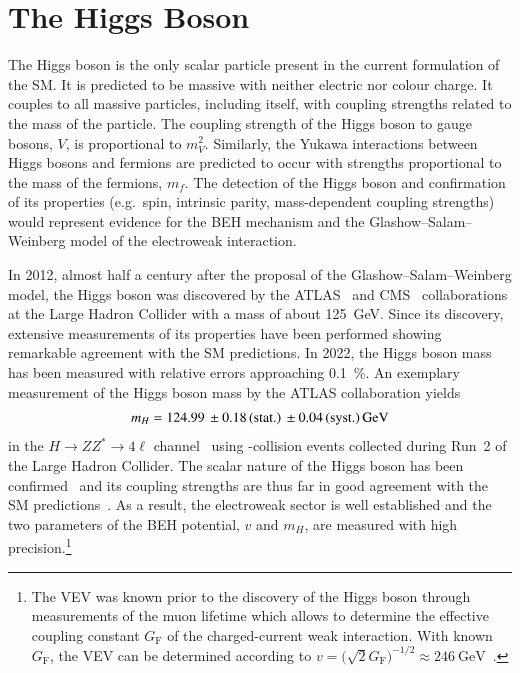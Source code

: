 \section{The Higgs Boson}

The Higgs boson is the only scalar particle present in the current formulation
of the SM. It is predicted to be massive with neither electric nor colour
charge. It couples to all massive particles, including itself, with coupling
strengths related to the mass of the particle. The coupling strength of the
Higgs boson to gauge bosons, $V$, is proportional to $m_{V}^2$. Similarly, the
Yukawa interactions between Higgs bosons and fermions are predicted to occur
with strengths proportional to the mass of the fermions, $m_f$. The detection of
the Higgs boson and confirmation of its properties (e.g.\ spin, intrinsic
parity, mass-dependent coupling strengths) would represent evidence
for the BEH mechanism and the Glashow--Salam--Weinberg model of the electroweak
interaction.

In 2012, almost half a century after the proposal of the
Glashow--Salam--Weinberg model, the Higgs boson was discovered by the
ATLAS~\cite{HIGG-2012-27} and CMS~\cite{CMS-HIG-12-028} collaborations at the
Large Hadron Collider with a mass of about \SI{125}{\GeV}. Since its discovery,
extensive measurements of its properties have been performed showing remarkable
agreement with the SM predictions. In 2022, the Higgs boson mass has been
measured with relative errors approaching \SI{0.1}{\percent}. An exemplary
measurement of the Higgs boson mass by the ATLAS collaboration yields
\begin{align*}
  m_{H} = \num{124.99}%
  \valuesep\numerrt{0.18}{stat.}%
  \valuesep\numerrt{0.04}{syst.}%
  \valuesep\si{\GeV}
\end{align*}
in the $H \to Z Z^{*} \to 4\ell$ channel~\cite{HIGG-2020-07} using \pp-collision
events collected during Run~2 of the Large Hadron Collider. The scalar nature of
the Higgs boson has been
confirmed~\cite{HIGG-2013-17-witherratum,CMS-HIG-14-018} and its coupling
strengths are thus far in good agreement with the SM
predictions~\cite{HIGG-2021-23,CMS-HIG-22-001}. As a result, the electroweak
sector is well established and the two parameters of the BEH potential, $v$ and
$m_{H}$, are measured with high precision.\footnote{The VEV was known prior to
  the discovery of the Higgs boson through measurements of the muon lifetime
  which allows to determine the effective coupling constant $G_{\text{F}}$ of
  the charged-current weak interaction. With known $G_{\text{F}}$, the VEV can
  be determined according to
  $v = \bigl( \sqrt{2} G_{\text{F}} \bigr)^{-1/2} \approx
  \SI{246}{\GeV}$~\cite{MuLan:2010shf}.}


